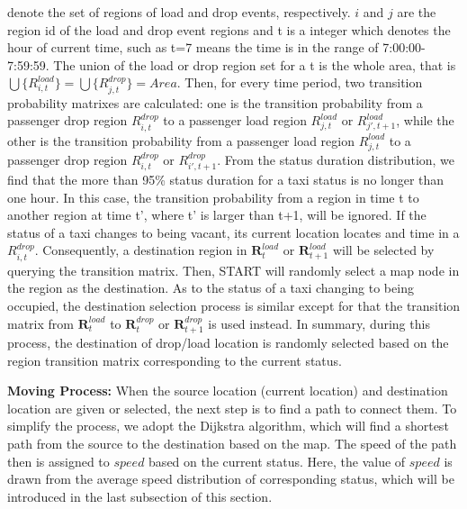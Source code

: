 denote the set of regions of load and drop events, respectively. $i$ and $j$ are the region id of the load and drop event regions and t is a integer which denotes the hour of current time, such as t=7 means the time is in the range of 7:00:00-7:59:59. The union of the load or drop region set for a t is the whole area, that is $\bigcup\{R_{i,t}^{load}\}=\bigcup\{R_{j,t}^{drop}\} = Area $.
Then, for every time period, two transition probability matrixes are calculated: one is the transition probability from a passenger drop region $R_{i,t}^{drop}$ to a passenger load region $R_{j,t}^{load}$ or $R_{j',t+1}^{load}$, while the other is the transition probability from a passenger load region $R_{j,t}^{load}$ to a passenger drop region $R_{i,t}^{drop}$ or $R_{i',t+1}^{drop}$. From the status duration distribution, we find that the more than 95\% status duration for a taxi status is no longer than one hour. In this case, the transition probability from a region in time t to another region at time t’, where t’ is larger than t+1,  will be ignored. 
If the status of a taxi changes to being vacant, its current location locates and time in a $R_{i,t}^{drop}$. Consequently, a destination region in $\textbf{R}_{t}^{load}$ or $\textbf{R}_{t+1}^{load}$ will be selected by querying the transition matrix. Then, START will randomly select a map node in the region as the destination. As to the status of a taxi changing to being occupied, the destination selection process is similar except for that the transition matrix from $\textbf{R}_{t}^{load}$ to $\textbf{R}_t^{drop}$ or $\textbf{R}_{t+1}^{drop}$ is used instead. In summary, during this process, the destination of drop/load location is randomly selected based on the region transition matrix corresponding to the current status.

\textbf{Moving Process:} When the source location (current location) and destination location are given or selected, the next step is to find a path to connect them. To simplify the process, we adopt the Dijkstra algorithm, which will find a shortest path from the source to the destination based on the map. The speed of the path then is assigned to $speed$ based on the current status. Here, the value of $speed$ is drawn from the average speed distribution of corresponding status, which will be introduced in the last subsection of this section.

